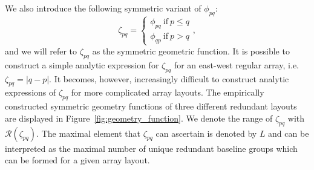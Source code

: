 \documentclass[useAMS,usenatbib]{mn2e}
\begin{document}
We also introduce the following symmetric variant of $\phi_{pq}$:
\begin{equation}
\zeta_{pq} = 
\begin{cases}
\phi_{pq}~\textrm{if}~p \leq q\\
\phi_{qp}~\textrm{if}~p>q
\end{cases},
\end{equation} 
and we will refer to $\zeta_{pq}$ as the symmetric geometric function.
It is possible to construct a simple analytic expression for $\zeta_{pq}$ for an east-west regular array, i.e. $\zeta_{pq} = |q-p|$. It becomes, however, increasingly difficult to construct analytic expressions of $\zeta_{pq}$ for more complicated array layouts. The empirically constructed symmetric geometry functions of three different redundant layouts are displayed in Figure~\ref{fig:geometry_function}. We denote the range of $\zeta_{pq}$ with $\mathcal{R}(\zeta_{pq})$. The maximal element that $\zeta_{pq}$ can ascertain is denoted by $L$ and can be interpreted as the maximal number of unique redundant baseline groups which can be formed for a given array layout. 
\end{document}
